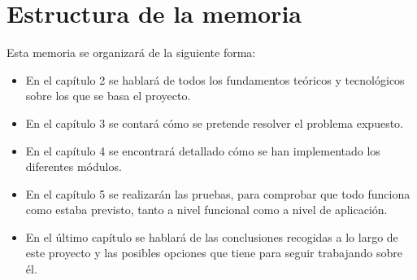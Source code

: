 \section{Estructura de la memoria}

Esta memoria se organizará de la siguiente forma: 
\begin{itemize}
\item En el capítulo 2 se hablará de todos los fundamentos teóricos y tecnológicos sobre los que se 
basa el proyecto.
\item En el capítulo 3 se contará cómo se pretende resolver el problema expuesto.
\item En el capítulo 4 se encontrará detallado cómo se han implementado los diferentes módulos.
\item En el capítulo 5 se realizarán las pruebas, para comprobar que todo funciona como 
estaba previsto, tanto a nivel funcional como a nivel de aplicación.
\item En el último capítulo se hablará de las conclusiones recogidas a lo largo de este proyecto y las posibles 
opciones que tiene para seguir trabajando sobre él.
\end{itemize}
\newpage